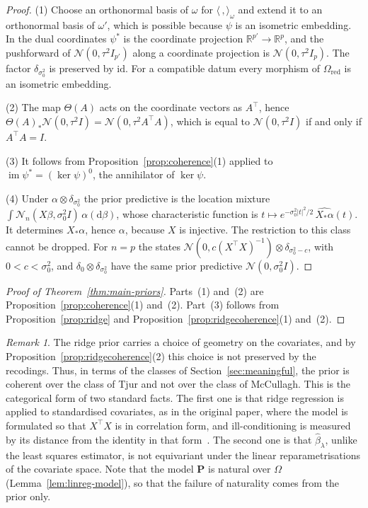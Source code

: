 \documentclass[11pt,a4paper]{article}
\theoremstyle{plain}
\theoremstyle{definition}
\theoremstyle{remark}
\newtheorem{remark}[theorem]{Remark}
\newcommand{\cat}[1]{\mathsf{#1}}
\newcommand{\catO}{\cat{\Omega}}
\newcommand{\id}{\mathrm{id}}
\newcommand{\R}{\mathbb{R}}
\newcommand{\Norm}{\mathcal{N}}
\begin{document}
\begin{proof}
(1) Choose an orthonormal basis of $\omega$ for
$\langle\,,\rangle_{\omega}$ and extend it to an orthonormal basis of
$\omega'$, which is possible because $\psi$ is an isometric embedding. In the
dual coordinates $\psi^{*}$ is the coordinate projection
$\R^{p'} \to \R^{p}$, and the pushforward of $\Norm(0,\tau^{2}I_{p'})$ along a
coordinate projection is $\Norm(0,\tau^{2}I_{p})$. The factor
$\delta_{\sigma_{0}^{2}}$ is preserved by $\id$. For a compatible datum every
morphism of $\catO_{\mathrm{red}}$ is an isometric embedding.

(2) The map $\Theta(A)$ acts on the coordinate vectors as $A^{\!\top}$, hence
$\Theta(A)_{*}\Norm(0,\tau^{2}I) = \Norm(0,\tau^{2}A^{\!\top}A)$, which is
equal to $\Norm(0,\tau^{2}I)$ if and only if $A^{\!\top}A = I$.

(3) It follows from Proposition~\ref{prop:coherence}(1) applied to
$\operatorname{im}\psi^{*} = (\ker\psi)^{0}$, the annihilator of $\ker\psi$.

(4) Under $\alpha\otimes\delta_{\sigma_{0}^{2}}$ the prior predictive is the
location mixture
$\int \Norm_{n}(X\beta,\sigma_{0}^{2}I)\,\alpha(\mathrm{d}\beta)$, whose
characteristic function is
$t \mapsto e^{-\sigma_{0}^{2}|t|^{2}/2}\,\widehat{X_{*}\alpha}(t)$. It
determines $X_{*}\alpha$, hence $\alpha$, because $X$ is injective. The
restriction to this class cannot be dropped. For $n = p$ the states
$\Norm(0,c(X^{\!\top}X)^{-1})\otimes\delta_{\sigma_{0}^{2}-c}$, with
$0 < c < \sigma_{0}^{2}$, and $\delta_{0}\otimes\delta_{\sigma_{0}^{2}}$ have
the same prior predictive $\Norm(0,\sigma_{0}^{2}I)$.
\end{proof}

\begin{proof}[Proof of Theorem~\ref{thm:main-priors}]
Parts~(1) and~(2) are Proposition~\ref{prop:coherence}(1) and~(2). Part~(3)
follows from Proposition~\ref{prop:ridge} and
Proposition~\ref{prop:ridgecoherence}(1) and~(2).
\end{proof}

\begin{remark}\label{rem:standardise}
The ridge prior carries a choice of geometry on the covariates, and by
Proposition~\ref{prop:ridgecoherence}(2) this choice is not preserved by the
recodings. Thus, in terms of the classes of Section~\ref{sec:meaningful}, the
prior is coherent over the class of Tjur and not over the class of McCullagh.
This is the categorical form of two standard facts. The first one is that
ridge regression is applied to standardised covariates, as in the original
paper, where the model is formulated so that
$X^{\!\top}X$ is in correlation form, and ill-conditioning is measured by its
distance from the identity in that
form~\cite[pp.~55--56]{hoerl_ridge_1970}. The second one is that
$\widehat\beta_{\lambda}$, unlike the least squares estimator, is not
equivariant under the linear reparametrisations of the covariate space. Note
that the model $\mathbf{P}$ is natural over $\catO$
(Lemma~\ref{lem:linreg-model}), so that the failure of naturality comes from
the prior only.
\end{remark}
\end{document}
